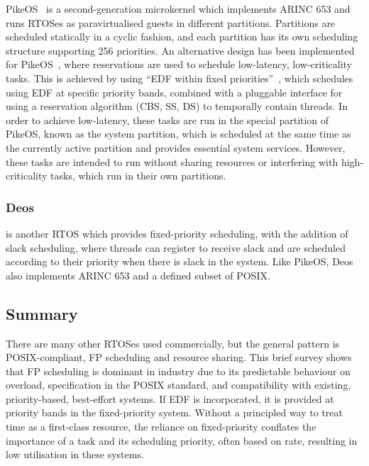 PikeOS~\citep{PikeOS:URL} is a second-generation microkernel which implements ARINC 653 
and runs RTOSes as paravirtualised guests in different partitions. Partitions are scheduled
statically in a cyclic fashion, and each partition has its own scheduling structure supporting 256
priorities.
An alternative design has been implemented for PikeOS~\citep{Vanga_BTB_17}, where reservations are
used to schedule low-latency, low-criticality tasks.
This is achieved by using ``\gls{EDF} within fixed priorities''~\citep{Harbour_Palencia_03}, which
schedules using EDF at specific priority bands, combined with a pluggable interface for using a
reservation algorithm (\eg \gls{CBS}, \gls{SS}, \gls{DS}) to temporally contain threads. In order to achieve low-latency, these tasks are run
in the special partition of PikeOS, known as the system partition, which is scheduled at the same
time as the currently active partition and provides essential system services. However, these tasks
are intended to run without sharing resources or interfering with high-criticality tasks, which run
in their own partitions.

\subsubsection{Deos}

\citet{Deos:URL} is another RTOS which provides fixed-priority scheduling, with the addition of slack
scheduling, where threads can register to receive slack and are scheduled according to their
priority when there is slack in the system. Like PikeOS, Deos also implements ARINC 653 and a
defined subset of POSIX.

\subsection{Summary}

There are many other \gls{RTOS}es used commercially, but the general pattern is POSIX-compliant, 
\gls{FP} scheduling and resource sharing.
This brief survey shows that \gls{FP} scheduling is dominant in industry due to its predictable
behaviour on overload, specification in the
POSIX standard, and compatibility with existing, priority-based, best-effort systems. 
If \gls{EDF} is incorporated, it is provided at priority bands in the fixed-priority system.
Without a principled way to treat time as a first-class resource, the reliance on fixed-priority
conflates the importance of a task and its scheduling priority, often based on rate, resulting in 
low utilisation in these systems.

